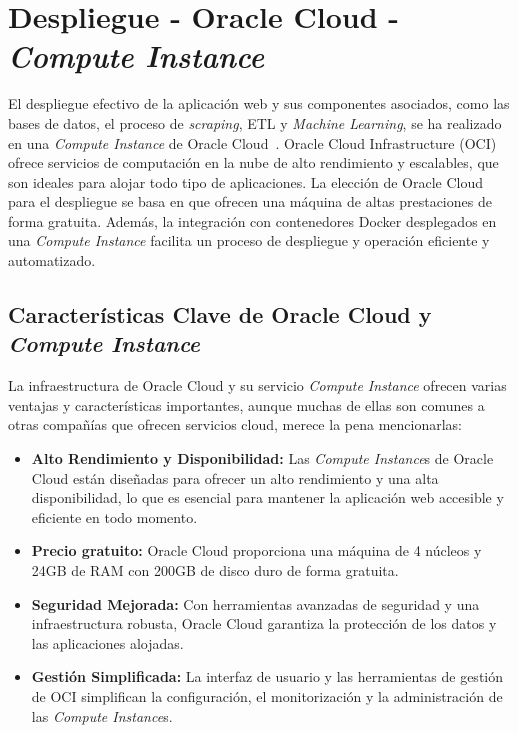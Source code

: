 \clearpage
\section{Despliegue - Oracle Cloud - \textit{Compute Instance}}

El despliegue efectivo de la aplicación web y sus componentes asociados, como las bases de datos, el proceso de \textit{scraping}, ETL y \textit{Machine Learning}, se ha realizado en una \textit{\textit{Compute Instance}} de Oracle Cloud~\cite{oraclecompute}. Oracle Cloud Infrastructure (OCI) ofrece servicios de computación en la nube de alto rendimiento y escalables, que son ideales para alojar todo tipo de aplicaciones. La elección de Oracle Cloud para el despliegue se basa en que ofrecen una máquina de altas prestaciones de forma gratuita. Además, la integración con contenedores Docker desplegados en una \textit{Compute Instance} facilita un proceso de despliegue y operación eficiente y automatizado.

\subsection{Características Clave de Oracle Cloud y \textit{Compute Instance}}

La infraestructura de Oracle Cloud y su servicio \textit{Compute Instance} ofrecen varias ventajas y características importantes, aunque muchas de ellas son comunes a otras compañías que ofrecen servicios cloud, merece la pena mencionarlas:

\begin{itemize}
    \item \textbf{Alto Rendimiento y Disponibilidad:} Las \textit{Compute Instance}s de Oracle Cloud están diseñadas para ofrecer un alto rendimiento y una alta disponibilidad, lo que es esencial para mantener la aplicación web accesible y eficiente en todo momento.

    \item \textbf{Precio gratuito:} Oracle Cloud proporciona una máquina de 4 núcleos y 24GB de RAM con 200GB de disco duro de forma gratuita.

    \item \textbf{Seguridad Mejorada:} Con herramientas avanzadas de seguridad y una infraestructura robusta, Oracle Cloud garantiza la protección de los datos y las aplicaciones alojadas.

    \item \textbf{Gestión Simplificada:} La interfaz de usuario y las herramientas de gestión de OCI simplifican la configuración, el monitorización y la administración de las \textit{Compute Instance}s.
\end{itemize}

